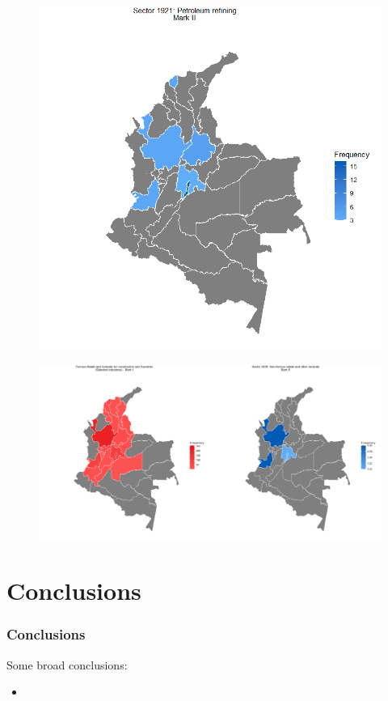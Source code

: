 \documentclass{beamer}
\begin{document}
\begin{frame}[allowframebreaks]
\begin{figure}
		\includegraphics[scale=0.25]{oil.png}
	\end{figure}
	\framebreak
	\begin{figure}
		\centering
		\includegraphics[scale=0.2]{metals.png}
	\end{figure}
	\end{frame}
\section{Conclusions}
	\begin{frame}[allowframebreaks]
		\frametitle{Conclusions}
		Some broad conclusions:
		\begin{itemize}
			\item 
		\end{itemize}
	\end{frame}
\end{document}
